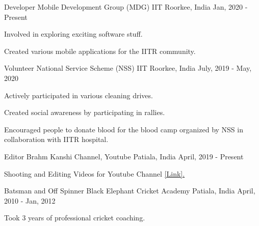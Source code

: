 

\begin{cventries}

  \cventry
    {Developer} %
    {Mobile Development Group (MDG)} %
    {IIT Roorkee, India} %
    {Jan, 2020 - Present} %
    {
      \begin{cvitems} %
        \item {Involved in exploring exciting software stuff.}
        \item {Created various mobile applications for the IITR community.}
      \end{cvitems}
    }

  \cventry
    {Volunteer} %
    {National Service Scheme (NSS)} %
    {IIT Roorkee, India} %
    {July, 2019 - May, 2020} %
    {
      \begin{cvitems} %
        \item {Actively participated in various cleaning drives.}
        \item {Created social awareness by participating in rallies.}
        \item {Encouraged people to donate blood for the blood camp organized by NSS in collaboration with IITR hospital.}
      \end{cvitems}
    }

  \cventry
    {Editor} %
    {Brahm Kanshi Channel, Youtube} %
    {Patiala, India} %
    {April, 2019 - Present} %
    {
      \begin{cvitems} %
        \item {Shooting and Editing Videos for Youtube Channel \href{https://www.youtube.com/channel/UCrQLssByTaHplRfoDVdpUPg?sub_confirmation=1}{[Link].}}
      \end{cvitems}
    }

  \cventry
    {Batsman and Off Spinner} %
    {Black Elephant Cricket Academy} %
    {Patiala, India} %
    {April, 2010 - Jan, 2012} %
    {
      \begin{cvitems} %
        \item {Took 3 years of professional cricket coaching.}
      \end{cvitems}
    }


\end{cventries}

